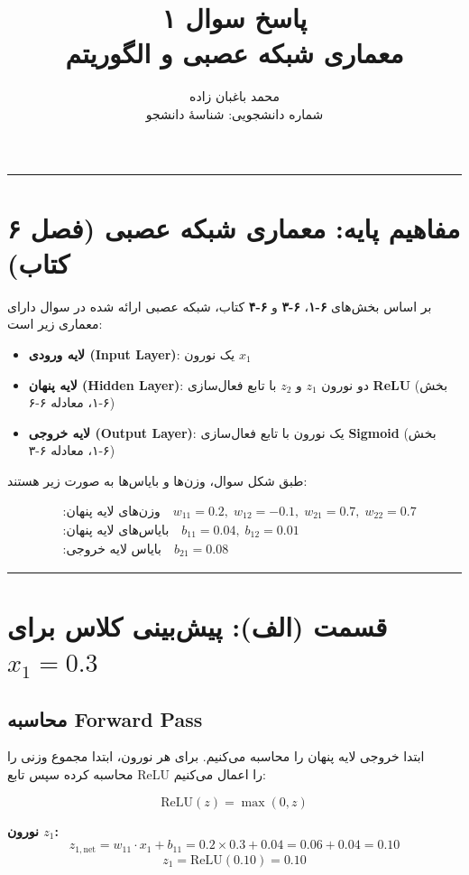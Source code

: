 \documentclass[11pt,a4paper]{article}
\title{\textbf{پاسخ سوال ۱} \\[0.4cm] \small معماری شبکه عصبی و الگوریتم \en{Backpropagation}}
\author{محمد باغبان زاده \\ شماره دانشجویی: شناسهٔ دانشجو}
\date{}
\newcommand{\en}[1]{\textenglish{#1}}
\newcommand{\separator}{\vspace{1em}\noindent\rule{\linewidth}{0.4pt}\vspace{1em}}
\newcommand{\thickseparator}{\vspace{1em}\noindent\rule{\linewidth}{1pt}\vspace{1em}}
\begin{document}
\maketitle
\thickseparator

\section{مفاهیم پایه: معماری شبکه عصبی (فصل \en{۶} کتاب)}

بر اساس بخش‌های \textbf{\en{۶-۱}}، \textbf{\en{۶-۳}} و \textbf{\en{۶-۴}} کتاب، شبکه عصبی ارائه شده در سوال دارای معماری زیر است:

\begin{itemize}
    \item \textbf{لایه ورودی (\en{Input Layer})}: یک نورون \(x_1\)
    \item \textbf{لایه پنهان (\en{Hidden Layer})}: دو نورون \(z_1\) و \(z_2\) با تابع فعال‌سازی \textbf{\en{ReLU}} (بخش \en{۶-۱}، معادله \en{۶-۶})
    \item \textbf{لایه خروجی (\en{Output Layer})}: یک نورون با تابع فعال‌سازی \textbf{\en{Sigmoid}} (بخش \en{۶-۱}، معادله \en{۶-۳})
\end{itemize}

طبق شکل سوال، وزن‌ها و بایاس‌ها به صورت زیر هستند:

\begin{align*}
&\text{:وزن‌های لایه پنهان} \quad w_{11} = 0.2,\; w_{12} = -0.1,\; w_{21} = 0.7,\; w_{22} = 0.7 \\
&\text{:بایاس‌های لایه پنهان} \quad b_{11} = 0.04,\; b_{12} = 0.01 \\
&\text{:بایاس لایه خروجی} \quad b_{21} = 0.08
\end{align*}

\separator
\section{قسمت (الف): پیش‌بینی کلاس برای \(x_1 = 0.3\)}

\subsection{محاسبه \en{Forward Pass}}

ابتدا خروجی لایه پنهان را محاسبه می‌کنیم. برای هر نورون، ابتدا مجموع وزنی را محاسبه کرده سپس تابع \en{ReLU} را اعمال می‌کنیم:

\[
\text{ReLU}(z) = \max(0, z)
\]

\textbf{نورون \(z_1\):}
\[
z_{1,\text{net}} = w_{11} \cdot x_1 + b_{11} = 0.2 \times 0.3 + 0.04 = 0.06 + 0.04 = 0.10
\]
\[
z_1 = \text{ReLU}(0.10) = 0.10
\]
\end{document}
